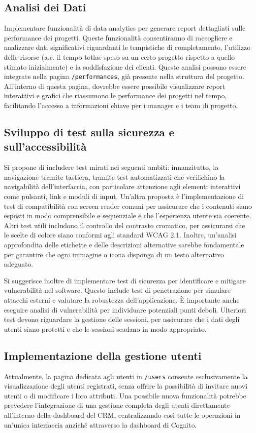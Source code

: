 \documentclass[target=bach,aauheader=,style=]{thud}
\begin{document}
\subsection{Analisi dei Dati}
Implementare funzionalità di data analytics per generare report dettagliati sulle performance dei progetti. Queste funzionalità consentiranno di raccogliere e analizzare dati significativi riguardanti le tempistiche di completamento, l'utilizzo delle risorse (a.e. il tempo totlae speso su un certo progetto rispetto a quello stimato inizialmente) e la soddisfazione dei clienti. Queste analisi possono essere integrate nella pagina \texttt{/performances}, già presente nella struttura del progetto. All'interno di questa pagina, dovrebbe essere possibile visualizzare report interattivi e grafici che riassumono le performance dei progetti nel tempo, facilitando l'accesso a informazioni chiave per i manager e i team di progetto.

\subsection{Sviluppo di test sulla sicurezza e sull'accessibilità}
Si propone di includere test mirati nei seguenti ambiti: innanzitutto, la navigazione tramite tastiera, tramite test automatizzati che verifichino la navigabilità dell'interfaccia, con particolare attenzione agli elementi interattivi come pulsanti, link e moduli di input. Un'altra proposta è l'implementazione di test di compatibilità con screen reader comuni per assicurare che i contenuti siano esposti in modo comprensibile e sequenziale e che l'esperienza utente sia coerente. Altri test utili includono il controllo del contrasto cromatico, per assicurarsi che le scelte di colore siano conformi agli standard WCAG 2.1. Inoltre, un'analisi approfondita delle etichette e delle descrizioni alternative sarebbe fondamentale per garantire che ogni immagine o icona disponga di un testo alternativo adeguato. 

\noindent Si suggerisce inoltre di implementare test di sicurezza per identificare e mitigare vulnerabilità nel software. Questo include test di penetrazione per simulare attacchi esterni e valutare la robustezza dell'applicazione. È importante anche eseguire analisi di vulnerabilità per individuare potenziali punti deboli. Ulteriori test devono riguardare la gestione delle sessioni, per assicurare che i dati degli utenti siano protetti e che le sessioni scadano in modo appropriato.

\subsection{Implementazione della gestione utenti}
Attualmente, la pagina dedicata agli utenti in \texttt{/users} consente esclusivamente la visualizzazione degli utenti registrati, senza offrire la possibilità di invitare nuovi utenti o di modificare i loro attributi. Una possibile nuova funzionalità potrebbe prevedere l'integrazione di una gestione completa degli utenti direttamente all'interno della dashboard del CRM, centralizzando così tutte le operazioni in un'unica interfaccia anziché attraverso la dashboard di Cognito.
\end{document}
